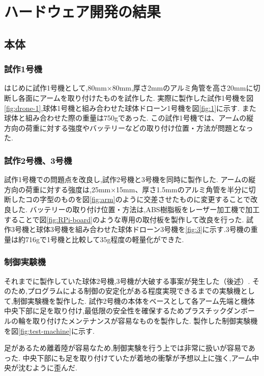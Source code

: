 \documentclass[a4paper]{jarticle}
\begin{document}
\section{ハードウェア開発の結果}

\subsection{本体}

\subsubsection{試作1号機}
はじめに試作1号機として,80mm×80mm,厚さ2mmのアルミ角管を高さ20mmに切断し各面にアームを取り付けたものを試作した.
実際に製作した試作1号機を図\ref{fig:drone-1},球体1号機と組み合わせた球体ドローン1号機を図\ref{fig:1}に示す.
また球体と組み合わせた際の重量は750gであった.
この試作1号機では、アームの縦方向の荷重に対する強度やバッテリーなどの取り付け位置・方法が問題となった.

\subsubsection{試作2号機、3号機}
試作1号機での問題点を改良し,試作2号機と3号機を同時に製作した.
アームの縦方向の荷重に対する強度は,25mm×15mm、厚さ1.5mmのアルミ角管を半分に切断したコの字型のものを図\ref{fig:arm}のように交差させたものに変更することで改良した.
バッテリーの取り付け位置・方法は,ABS樹脂板をレーザー加工機で加工することで図\ref{fig:RPi-board}のような専用の取付板を製作して改良を行った.
試作3号機と球体3号機を組み合わせた球体ドローン3号機を\ref{fig:3}に示す.3号機の重量は約716gで1号機と比較して35g程度の軽量化ができた.

\subsubsection{制御実験機}
それまでに製作していた球体2号機,3号機が大破する事案が発生した（後述）.
そのため,プログラムによる制御の安定化がある程度実現できるまでの実験機として,制御実験機を製作した.
試作2号機の本体をベースとして各アーム先端と機体中央下部に足を取り付け,最低限の安全性を確保するためプラスチックダンボールの輪を取り付けたメンテナンスが容易なものを製作した.
製作した制御実験機を図\ref{fig:test-machine}に示す.

足があるため離着陸が容易なため,制御実験を行う上では非常に扱いが容易であった.
中央下部にも足を取り付けていたが着地の衝撃が予想以上に強く,アーム中央が沈むように歪んだ.
\end{document}

